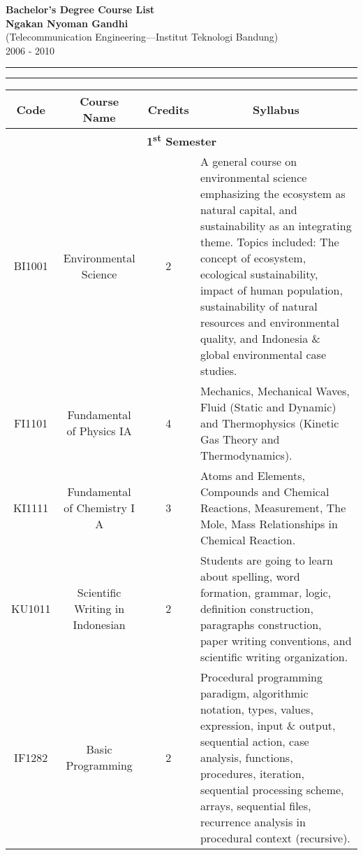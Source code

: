 \documentclass{article}
\newcommand{\soptitle}{\textbf{Bachelor's Degree Course List}}
\newcommand{\yourname}{\textbf{Ngakan Nyoman Gandhi}}
\begin{document}
    \begin{center}\LARGE\soptitle\\
    \large \yourname\ \\ (Telecommunication Engineering---Institut Teknologi Bandung)\\ 2006 - 2010 \normalsize

    \hrule
    \vspace{1pt}
    \hrule height 1pt

    \bigskip

        \begin{tabular}{ | c | c | c | p{7cm} |} %
            \hline
            \textbf{Code} & \textbf{Course Name} & \textbf{Credits} & \multicolumn{1}{c|}{\textbf{Syllabus}}\\\hline
            
            \hline\multicolumn{4}{|c|}{\cellcolor[gray]{0.80}\textbf{1\textsuperscript{st} Semester}}	\\ \cline{1-4}
            
            BI1001 & Environmental Science & 2 & A general course on environmental science emphasizing the ecosystem as natural capital, and sustainability as an integrating theme. Topics included: The concept of ecosystem, ecological sustainability, impact of human population, sustainability of natural resources and environmental quality, and Indonesia \& global environmental case studies. \\ \hline 

            FI1101 & Fundamental of Physics IA & 4 & Mechanics, Mechanical Waves, Fluid (Static and Dynamic) and Thermophysics (Kinetic Gas Theory and Thermodynamics). \\ \hline
            
            KI1111 & Fundamental of Chemistry I A & 3 & Atoms and Elements, Compounds and Chemical Reactions, Measurement, The Mole, Mass Relationships in Chemical Reaction. \\ \hline
            
            KU1011 & Scientific Writing in Indonesian & 2 & Students are going to learn about spelling, word formation, grammar, logic, definition construction, paragraphs construction, paper writing conventions, and scientific writing organization. \\ \hline
            
            IF1282 & Basic Programming & 2 & Procedural programming paradigm, algorithmic notation, types, values, expression, input \& output, sequential action, case analysis, functions, procedures, iteration, sequential processing scheme, arrays, sequential files, recurrence analysis in procedural context (recursive). \\\hline       
            

\end{tabular}
\end{center}
\end{document}
